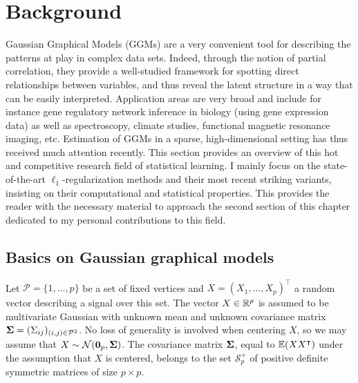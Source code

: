 \section{Background}
\label{sec:chap2:background}

Gaussian              Graphical             Models              (GGMs)
\cite{1996_Book_Lauritzen,whittaker1990graphical}    are     a    very
convenient tool  for describing the  patterns at play in  complex data
sets.  Indeed, through the notion of partial correlation, they provide
a  well-studied framework  for spotting  direct relationships  between
variables, and thus  reveal the latent structure in a  way that can be
easily interpreted. Application  areas are very broad  and include for
instance  gene regulatory  network  inference in  biology (using  gene
expression data) as well  as spectroscopy, climate studies, functional
magnetic  resonance imaging,  etc.  Estimation  of GGMs  in a  sparse,
high-dimensional setting  has thus  received much  attention recently.
This section provides an overview of this hot and competitive research
field of statistical learning.  I mainly focus on the state-of-the-art
$\ell_1$-regularization  methods   and  their  most   recent  striking
variants, insisting on their computational and statistical properties.
This provides the  reader with the necessary material  to approach the
second section of this chapter  dedicated to my personal contributions
to this field.

\subsection{Basics on Gaussian graphical models}
\label{sec:chap2:background:ggm}

Let  $\mathcal{P}=\{1,\dots,p\}$  be  a  set  of  fixed  vertices  and
$X=(X_1,\dots,X_p)^\intercal$ a random vector describing a signal over
this set.   The vector  $X\in \mathbb{R}^p$ is  assumed to  be multivariate
Gaussian  with unknown  mean and  unknown covariance  matrix ${\boldsymbol\Sigma}  =
(\Sigma_{ij})_{(i,j)\in\mathcal{P}^2}$.   No  loss  of  generality  is
involved    when   centering    $X$,   so    we   may    assume   that
$X\sim\mathcal{N}(\mathbf{0}_p,{\boldsymbol\Sigma})$. The covariance matrix ${\boldsymbol\Sigma}$, equal
to  $\mathbb{E}(XX^\intercal)$  under the  assumption  that  $X$ is  centered,
belongs to the set  $\mathcal{S}_{p}^+$ of positive definite symmetric
matrices of size $p\times p$.

